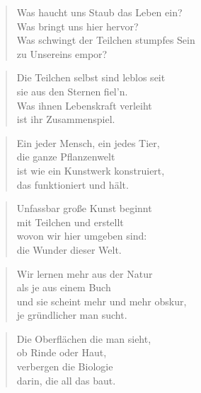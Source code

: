 \documentclass[10pt,a4paper]{article}
\begin{document}
\begin{multicols}{2}


\begin{verse}
Was haucht uns Staub das Leben ein? \\
Was bringt uns hier hervor? \\
Was schwingt der Teilchen stumpfes Sein \\
zu Unsereins empor? \\
\end{verse}

\begin{verse}
Die Teilchen selbst sind leblos seit \\
sie aus den Sternen fiel’n. \\
Was ihnen Lebenskraft verleiht \\
ist ihr Zusammenspiel. \\
\end{verse}

\begin{verse}
Ein jeder Mensch, ein jedes Tier, \\
die ganze Pflanzenwelt \\
ist wie ein Kunstwerk konstruiert, \\
das funktioniert und hält. \\
\end{verse}

\begin{verse}
Unfassbar große Kunst beginnt \\
mit Teilchen und erstellt \\
wovon wir hier umgeben sind: \\
die Wunder dieser Welt. \\
\end{verse}

\begin{verse}
Wir lernen mehr aus der Natur \\
als je aus einem Buch \\
und sie scheint mehr und mehr obskur, \\
je gründlicher man sucht. \\
\end{verse}

\begin{verse}
Die Oberflächen die man sieht, \\
ob Rinde oder Haut, \\
verbergen die Biologie \\
darin, die all das baut. \\
\end{verse}


\end{multicols}
\end{document}
